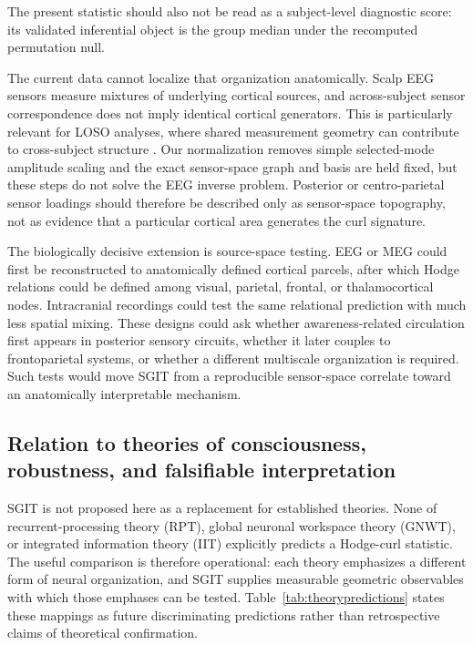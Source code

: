 \documentclass[12pt]{article}
\begin{document}
The present statistic should also not be read as a subject-level diagnostic score: its validated inferential object is the group median under the recomputed permutation null.

The current data cannot localize that organization anatomically. Scalp EEG sensors measure mixtures of underlying cortical sources, and across-subject sensor correspondence does not imply identical cortical generators. This is particularly relevant for LOSO analyses, where shared measurement geometry can contribute to cross-subject structure \citep{Ramirez2020}. Our normalization removes simple selected-mode amplitude scaling and the exact sensor-space graph and basis are held fixed, but these steps do not solve the EEG inverse problem. Posterior or centro-parietal sensor loadings should therefore be described only as sensor-space topography, not as evidence that a particular cortical area generates the curl signature.

The biologically decisive extension is source-space testing. EEG or MEG could first be reconstructed to anatomically defined cortical parcels, after which Hodge relations could be defined among visual, parietal, frontal, or thalamocortical nodes. Intracranial recordings could test the same relational prediction with much less spatial mixing. These designs could ask whether awareness-related circulation first appears in posterior sensory circuits, whether it later couples to frontoparietal systems, or whether a different multiscale organization is required. Such tests would move SGIT from a reproducible sensor-space correlate toward an anatomically interpretable mechanism.

\subsection{Relation to theories of consciousness, robustness, and falsifiable interpretation}
SGIT is not proposed here as a replacement for established theories. None of recurrent-processing theory (RPT), global neuronal workspace theory (GNWT), or integrated information theory (IIT) explicitly predicts a Hodge-curl statistic. The useful comparison is therefore operational: each theory emphasizes a different form of neural organization, and SGIT supplies measurable geometric observables with which those emphases can be tested. Table~\ref{tab:theorypredictions} states these mappings as future discriminating predictions rather than retrospective claims of theoretical confirmation.
\end{document}
